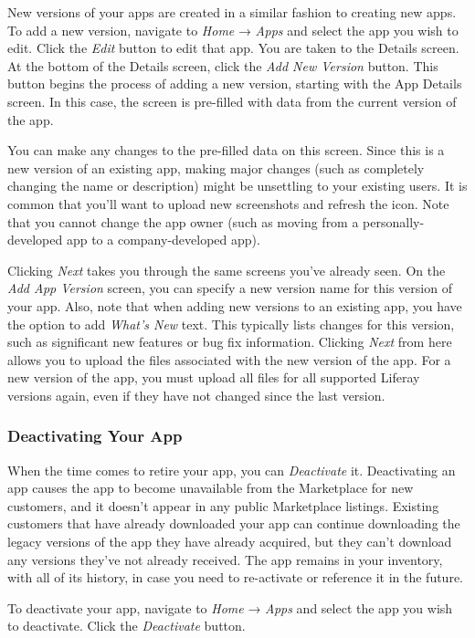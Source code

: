 New versions of your apps are created in a similar fashion to creating
new apps. To add a new version, navigate to \emph{Home} → \emph{Apps}
and select the app you wish to edit. Click the \emph{Edit} button to
edit that app. You are taken to the Details screen. At the bottom of the
Details screen, click the \emph{Add New Version} button. This button
begins the process of adding a new version, starting with the App
Details screen. In this case, the screen is pre-filled with data from
the current version of the app.

You can make any changes to the pre-filled data on this screen. Since
this is a new version of an existing app, making major changes (such as
completely changing the name or description) might be unsettling to your
existing users. It is common that you'll want to upload new screenshots
and refresh the icon. Note that you cannot change the app owner (such as
moving from a personally-developed app to a company-developed app).

Clicking \emph{Next} takes you through the same screens you've already
seen. On the \emph{Add App Version} screen, you can specify a new
version name for this version of your app. Also, note that when adding
new versions to an existing app, you have the option to add \emph{What's
New} text. This typically lists changes for this version, such as
significant new features or bug fix information. Clicking \emph{Next}
from here allows you to upload the files associated with the new version
of the app. For a new version of the app, you must upload all files for
all supported Liferay versions again, even if they have not changed
since the last version.

\subsubsection{Deactivating Your App}\label{deactivating-your-app}

When the time comes to retire your app, you can \emph{Deactivate} it.
Deactivating an app causes the app to become unavailable from the
Marketplace for new customers, and it doesn't appear in any public
Marketplace listings. Existing customers that have already downloaded
your app can continue downloading the legacy versions of the app they
have already acquired, but they can't download any versions they've not
already received. The app remains in your inventory, with all of its
history, in case you need to re-activate or reference it in the future.

To deactivate your app, navigate to \emph{Home} → \emph{Apps} and select
the app you wish to deactivate. Click the \emph{Deactivate} button.

